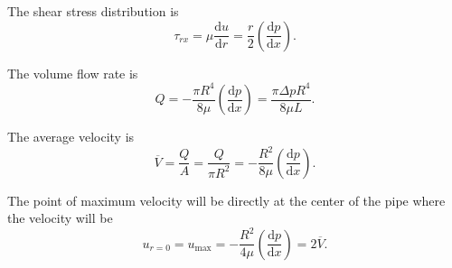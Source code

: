 The shear stress distribution is
\[ 
  \tau_{rx} = \mu \frac{\mathrm{d}u}{\mathrm{d}r}  = \frac{r}{2} \left( \frac{\mathrm{d}p}{\mathrm{d}x}  \right)
.\]

The volume flow rate is
\[ 
Q = -\frac{\pi R^{4}}{8\mu} \left( \frac{\mathrm{d}p}{\mathrm{d}x}  \right) = \frac{\pi \Delta p R^{4}}{8 \mu L}
.\]

The average velocity is
\[ 
\overline{V} = \frac{Q}{A} = \frac{Q}{\pi R^2} = - \frac{R^2}{8 \mu} \left( \frac{\mathrm{d}p}{\mathrm{d}x}  \right)
.\]

The point of maximum velocity will be directly at the center of the pipe where the velocity will be
\[ 
u_{r = 0} = u_{\mathrm{max}} = - \frac{R^2}{4\mu} \left( \frac{\mathrm{d}p}{\mathrm{d}x}  \right) = 2 \overline{V}
.\]

